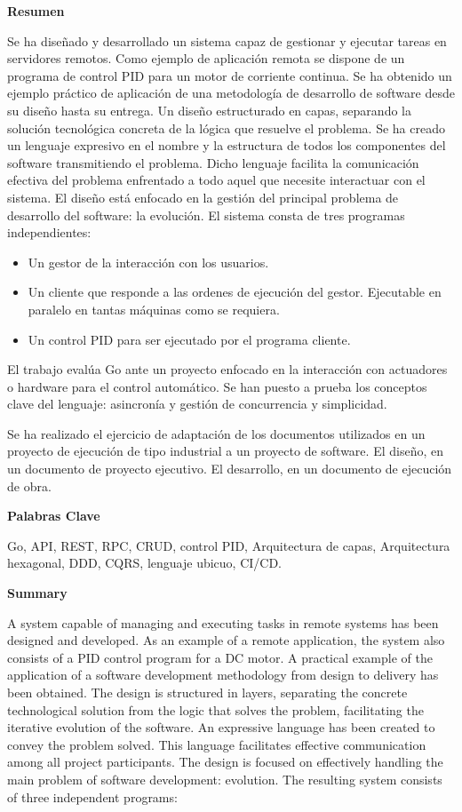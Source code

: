 \textbf{Resumen}

Se ha diseñado y desarrollado un sistema capaz de gestionar y ejecutar tareas en servidores remotos.
Como ejemplo de aplicación remota se dispone de un programa de control PID para un motor de corriente continua.
Se ha obtenido un ejemplo práctico de aplicación de una metodología de desarrollo de software desde su diseño hasta su entrega.
Un diseño estructurado en capas, separando la solución tecnológica concreta de la lógica que resuelve el problema.
Se ha creado un lenguaje expresivo en el nombre y la estructura de todos los componentes del software transmitiendo el problema.
Dicho lenguaje facilita la comunicación efectiva del problema enfrentado a todo aquel que necesite interactuar con el sistema.
El diseño está enfocado en la gestión del principal problema de desarrollo del software: la evolución.
El sistema consta de tres programas independientes:

\begin{itemize}
    \item Un gestor de la interacción con los usuarios.
    \item Un cliente que responde a las ordenes de ejecución del gestor.
    Ejecutable en paralelo en tantas máquinas como se requiera.
    \item Un control PID para ser ejecutado por el programa cliente.
\end{itemize}

El trabajo evalúa Go ante un proyecto enfocado en la interacción con actuadores o hardware para el control automático.
Se han puesto a prueba los conceptos clave del lenguaje: asincronía y gestión de concurrencia y simplicidad.

Se ha realizado el ejercicio de adaptación de los documentos utilizados en un proyecto de ejecución de tipo industrial a un proyecto de software.
El diseño, en un documento de proyecto ejecutivo.
El desarrollo, en un documento de ejecución de obra.

\textbf{Palabras Clave}

Go,
API,
REST,
RPC,
CRUD,
control PID,
Arquitectura de capas,
Arquitectura hexagonal,
DDD,
CQRS,
lenguaje ubicuo,
CI/CD.

\newpage

\textbf{Summary}

A system capable of managing and executing tasks in remote systems has been designed and developed.
As an example of a remote application, the system also consists of a PID control program for a DC motor.
A practical example of the application of a software development methodology from design to delivery has been obtained.
The design is structured in layers, separating the concrete technological solution from the logic that solves the problem, facilitating the iterative evolution of the software.
An expressive language has been created to convey the problem solved.
This language facilitates effective communication among all project participants.
The design is focused on effectively handling the main problem of software development: evolution.
The resulting system consists of three independent programs:

